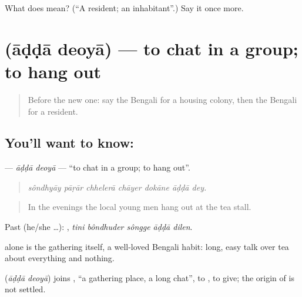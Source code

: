 \begin{tcolorbox}[breakable,colback=teal!4,colframe=teal!35!black,title={Before you move on}]
What does  mean? (\textquotedblleft{}A resident; an inhabitant\textquotedblright{}.) Say it once more.
\end{tcolorbox}
\section[\texorpdfstring{\bn{আড্ডা} \bn{দেওয়া} (āḍḍā deoyā)}{আড্ডা দেওয়া (āḍḍā deoyā)}]{  (āḍḍā deoyā) — to chat in a group; to hang out}

\label{lesson:BN-C409-adda-deoya}



\begin{quote}
Before the new one: say the Bengali for a housing colony, then the Bengali for a resident.
\end{quote}

\subsection*{You'll want to know:  }
\textbf{ } — \emph{āḍḍā deoyā} — \textquotedblleft{}to chat in a group; to hang out\textquotedblright{}.

\begin{quote}
      
\end{quote}

\begin{quote}
\emph{sôndhyāy pāṛār chhelerā chāyer dokāne āḍḍā dey.}
\end{quote}

\begin{quote}
In the evenings the local young men hang out at the tea stall.
\end{quote}

Past (he/she …):     , \emph{tini bôndhuder sôngge āḍḍā dilen}.

 alone is the gathering itself, a well-loved Bengali habit: long, easy talk over tea about everything and nothing.

\begin{cousinweb}
\textbf{ } (\emph{āḍḍā deoyā}) joins , \textquotedblleft{}a gathering place, a long chat\textquotedblright{}, to , to give; the origin of  is not settled.
\end{cousinweb}

